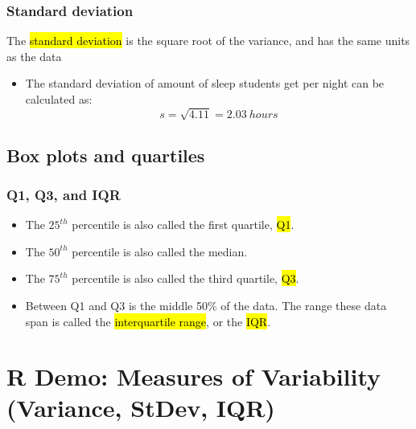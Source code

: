 \documentclass[slidestop,compress,mathserif]{beamer}
\begin{document}
\begin{frame}
\frametitle{Standard deviation}

The \hl{standard deviation} is the square root of the variance, and has the same units as the data

\formula{
\[ s = \sqrt{s^2} \]
}

\pause

{
\begin{itemize}

\item The standard deviation of amount of sleep students get per night can be calculated as:
\[ s = \sqrt{4.11} = 2.03~hours\]

\end{itemize}
}
{
}

\end{frame}


\subsection{Box plots and quartiles}


\begin{frame}[fragile]
\frametitle{Q1, Q3, and IQR}

\begin{itemize}

\item The $25^{th}$ percentile is also called the first quartile, \hl{Q1}.

\item The $50^{th}$ percentile is also called the median.

\item The $75^{th}$ percentile is also called the third quartile, \hl{Q3}.

\item Between Q1 and Q3 is the middle 50\% of the data. The range these data span is called the \hl{interquartile range}, or the \hl{IQR}.
\formula{\[ IQR = Q3 - Q1 \]}
\end{itemize}

\end{frame}

\section{R Demo: Measures of Variability (Variance, StDev, IQR)}



\end{document}

